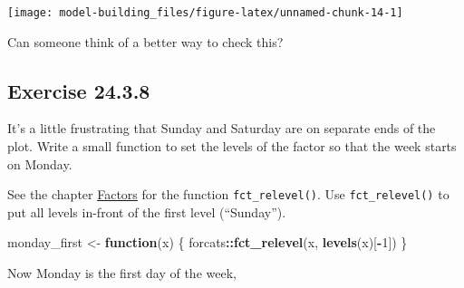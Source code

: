 \documentclass[]{book}
\newenvironment{Shaded}{\begin{snugshade}}{\end{snugshade}}
\newcommand{\ControlFlowTok}[1]{\textcolor[rgb]{0.13,0.29,0.53}{\textbf{#1}}}
\newcommand{\DataTypeTok}[1]{\textcolor[rgb]{0.13,0.29,0.53}{#1}}
\newcommand{\DecValTok}[1]{\textcolor[rgb]{0.00,0.00,0.81}{#1}}
\newcommand{\KeywordTok}[1]{\textcolor[rgb]{0.13,0.29,0.53}{\textbf{#1}}}
\newcommand{\NormalTok}[1]{#1}
\newcommand{\OperatorTok}[1]{\textcolor[rgb]{0.81,0.36,0.00}{\textbf{#1}}}
\newcommand{\OtherTok}[1]{\textcolor[rgb]{0.56,0.35,0.01}{#1}}
\newcommand{\StringTok}[1]{\textcolor[rgb]{0.31,0.60,0.02}{#1}}
\theoremstyle{plain}
\theoremstyle{remark}
\theoremstyle{definition}
\theoremstyle{definition}
\theoremstyle{definition}
\theoremstyle{remark}
\begin{document}
\begin{center}\texttt{[image: model-building\_files/figure-latex/unnamed-chunk-14-1]} \end{center}

Can someone think of a better way to check this?

\hypertarget{exercise-24.3.8}{%
\subsection*{\texorpdfstring{Exercise
{24.3.8}}{Exercise 24.3.8}}\label{exercise-24.3.8}}

It's a little frustrating that Sunday and Saturday are on separate ends
of the plot. Write a small function to set the levels of the factor so
that the week starts on Monday.

See the chapter \href{http://r4ds.had.co.nz/factors.html}{Factors} for
the function \texttt{fct\_relevel()}. Use \texttt{fct\_relevel()} to put
all levels in-front of the first level (``Sunday'').

\begin{Shaded}
\begin{Highlighting}[]
\NormalTok{monday_first <-}\StringTok{ }\ControlFlowTok{function}\NormalTok{(x) \{}
\NormalTok{  forcats}\OperatorTok{::}\KeywordTok{fct_relevel}\NormalTok{(x, }\KeywordTok{levels}\NormalTok{(x)[}\OperatorTok{-}\DecValTok{1}\NormalTok{])  }
\NormalTok{\}}
\end{Highlighting}
\end{Shaded}

Now Monday is the first day of the week,

\begin{Shaded}
\end{Shaded}
\end{document}
